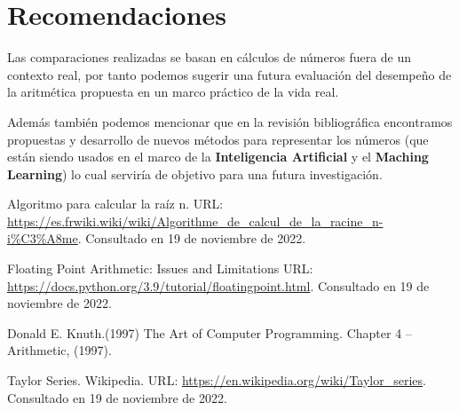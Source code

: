 \documentclass[a4paper,10pt,twocolumn]{article}
\begin{document}
\section{Recomendaciones}\label{sec:rec}

  Las comparaciones realizadas se basan en cálculos de números fuera de un contexto real, por tanto podemos sugerir una futura evaluación del desempeño de la aritmética propuesta en un marco práctico de la vida real.
  
  Además también podemos mencionar que en la revisión bibliográfica encontramos propuestas y desarrollo de nuevos métodos para representar los números (que están siendo usados en el marco de la  \textbf{Inteligencia Artificial} y el \textbf{Maching Learning}) lo cual serviría de objetivo para una futura investigación. 



\begin{thebibliography}{99}
	 Algoritmo para calcular la raíz n. URL: \href{https://es.frwiki.wiki/wiki/Algorithme_de_calcul_de_la_racine_n-i\%C3\%A8me}
	  {https://es.frwiki.wiki/wiki/Algorithme\_de\_calcul\_de\_la\_racine\_n-i\%C3\%A8me}.
		Consultado en 19 de noviembre de 2022.
	
	 Floating Point Arithmetic: Issues and Limitations URL: \href{https://docs.python.org/3.9/tutorial/floatingpoint.html}
	  {https://docs.python.org/3.9/tutorial/floatingpoint.html}.
		Consultado en 19 de noviembre de 2022.
		
	 Donald E. Knuth.(1997) The Art of Computer Programming. Chapter 4 – Arithmetic, (1997).	
		
	 Taylor Series. Wikipedia. URL: \href{https://en.wikipedia.org/wiki/Taylor_series}
	  {https://en.wikipedia.org/wiki/Taylor\_series}.
		Consultado en 19 de noviembre de 2022.
		
	
	
	
	

\end{thebibliography}


\label{end}
\end{document}
